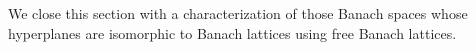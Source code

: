 \documentclass[11pt]{amsart}
\theoremstyle{definition}
\numberwithin{equation}{section}
\begin{document}

We close this section with a characterization of those Banach spaces whose hyperplanes are isomorphic to Banach lattices using free Banach lattices.
\end{document}
